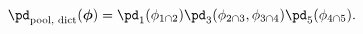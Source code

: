 \begin{equation}
  \pd_{\text{pool, dict}}(\boldsymbol{\phi}) =
  \pd_{1}(\phi_{1 \cap 2})
  \pd_{3}(\phi_{2 \cap 3}, \phi_{3 \cap 4})
  \pd_{5}(\phi_{4 \cap 5}).
  \label{eqn:dictatorial-def-two}
\end{equation}